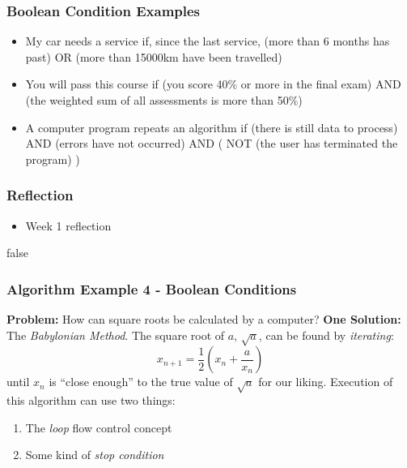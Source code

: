 \documentclass[14pt]{beamer}
\begin{document}
\begin{frame} %
\frametitle{Boolean Condition Examples}

\begin{itemize}
	\item My car needs a service if, since the last service, (more than 6 months has past) OR (more than 15000km have been travelled)
	\item You will pass this course if (you score 40\% or more in the final exam) AND (the weighted sum of all assessments is more than 50\%)
	\item A computer program repeats an algorithm if (there is still data to process) AND (errors have not occurred) AND ( NOT (the user has terminated the program) )
\end{itemize}
\end{frame}

\begin{frame}[fragile]
\frametitle{Reflection}
\begin{itemize}
\item Week 1 reflection
\end{itemize}
\end{frame}


\if false

\begin{frame}
\frametitle{Algorithm Example 4 - Boolean Conditions}
{\small
\textbf{Problem:} How can square roots be calculated by a computer?
\linebreak \linebreak
\textbf{One Solution:} The \textit{Babylonian Method}.
\linebreak \linebreak
The square root of $a$, $\sqrt{a}$, can be found by \textit{iterating}:
\begin{equation}
x_{n+1} = \frac{1}{2}\left(x_n + \frac{a}{x_n}\right)
\end{equation}
until $x_n$ is ``close enough'' to the true value of $\sqrt{a}$ for our liking.
Execution of this algorithm can use two things:
\begin{enumerate}
\item The \textit{loop} flow control concept
\item Some kind of \textit{stop condition}
\end{enumerate}
}
\end{frame}
\end{document}
